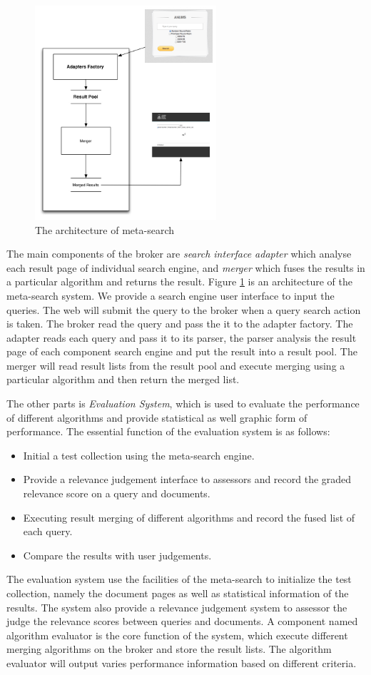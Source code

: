 \begin{figure}
\includegraphics[width=0.6\textwidth]{MS_ARC.jpg}
\caption{The architecture of meta-search}
\label{fig:ms_arc}
\end{figure}
The main components of the broker are \textit{search interface adapter} which analyse each result page of individual search engine, and \textit{merger}  which fuses the results in a particular algorithm and returns the result. Figure \ref{fig:ms_arc} is an architecture of the meta-search system. We provide a search engine user interface to input the queries. The web will submit the query to the broker when a query search action is taken. The broker read the query and pass the it to the adapter factory. The adapter reads each query and pass it to its parser, the parser analysis the result page of each component search engine and put the result into a result pool. The merger will read result lists from the result pool and execute merging using a particular algorithm and then return the merged list.

The other parts is \textit{Evaluation System}, which is used to evaluate the performance of different algorithms and provide statistical as well graphic form of performance. The essential function of the evaluation system is as follows:
\begin{itemize}
\item Initial a test collection using the meta-search engine.
\item Provide a relevance judgement interface to assessors and record the graded relevance score on a query and documents.
\item Executing result merging of different algorithms and record the fused list of each query.
\item Compare the results with user judgements.
\end{itemize}
The evaluation system use the facilities of the meta-search to initialize the test collection, namely the document pages as well as statistical information of the results. The system also provide a relevance judgement system to assessor the judge the relevance scores between queries and documents. A component named algorithm evaluator is the core function of the system, which execute different merging algorithms on the broker and store the result lists. The algorithm evaluator will output varies performance information based on different criteria.

